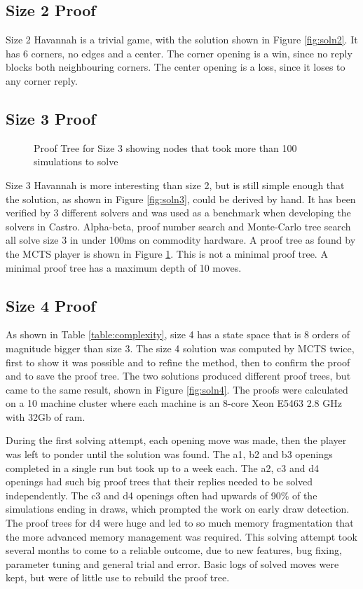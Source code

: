 \subsection{Size 2 Proof}

Size 2 Havannah is a trivial game, with the solution shown in Figure \ref{fig:soln2}. It has 6 corners, no edges and a center. The corner opening is a win, since no reply blocks both neighbouring corners. The center opening is a loss, since it loses to any corner reply.

\subsection{Size 3 Proof}

\begin{figure}
\centering

\caption[Proof Tree for Size 3]{Proof Tree for Size 3 showing nodes that took more than 100 simulations to solve}
\label{fig:proof3}
\end{figure}

Size 3 Havannah is more interesting than size 2, but is still simple enough that the solution, as shown in Figure \ref{fig:soln3}, could be derived by hand. It has been verified by 3 different solvers and was used as a benchmark when developing the solvers in Castro. Alpha-beta, proof number search and Monte-Carlo tree search all solve size 3 in under 100ms on commodity hardware. A proof tree as found by the MCTS player is shown in Figure \ref{fig:proof3}. This is not a minimal proof tree. A minimal proof tree has a maximum depth of 10 moves.


\subsection{Size 4 Proof}\label{sec:size4proof}

As shown in Table \ref{table:complexity}, size 4  has a state space that is 8 orders of magnitude bigger than size 3. The size 4 solution was computed by MCTS twice, first to show it was possible and to refine the method, then to confirm the proof and to save the proof tree. The two solutions produced different proof trees, but came to the same result, shown in Figure \ref{fig:soln4}. The proofs were calculated on a 10 machine cluster where each machine is an 8-core Xeon E5463 2.8 GHz with 32Gb of ram.

During the first solving attempt, each opening move was made, then the player was left to ponder until the solution was found. The a1, b2 and b3 openings completed in a single run but took up to a week each. The a2, c3 and d4 openings had such big proof trees that their replies needed to be solved independently. The c3 and d4 openings often had upwards of 90\% of the simulations ending in draws, which prompted the work on early draw detection. The proof trees for d4 were huge and led to so much memory fragmentation that the more advanced memory management was required. This solving attempt took several months to come to a reliable outcome, due to new features, bug fixing, parameter tuning and general trial and error. Basic logs of solved moves were kept, but were of little use to rebuild the proof tree.

